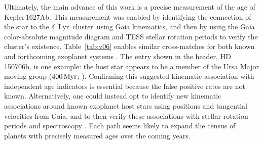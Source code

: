 \documentclass[12pt,modern,twocolumn,tighten]{aastex63}
\newcommand{\cn}{$\delta$\ Lyr\ cluster} %
\newcommand{\pn}{Kepler\,1627Ab} %
\begin{document}
Ultimately, the main advance of this work is a precise measurement of
the age of \pn.   This measurement was enabled by identifying the
connection of the star to the \cn\ using Gaia kinematics, and then by
using the Gaia color-absolute magnitude diagram and TESS stellar rotation periods to verify
the cluster's existence.  Table~\ref{tab:v06} enables similar
cross-matches for both known and forthcoming exoplanet
systems \citep[{\it e.g.},][]{guerrero_tess_2021}.  The entry shown in
the header, HD 150706b, is one example: the
host star appears to be a member of the Ursa Major moving group
($400\,{\rm Myr}$; \citealt{mann_tess_2020}).  Confirming
this suggested kinematic association with independent age indicators is
essential because the false positive rates are not known.
Alternatively, one could instead opt to identify new kinematic
associations around known exoplanet host stars using positions and
tangential velocities from Gaia, and to then verify these associations
with stellar rotation periods and spectroscopy \citep[{\it
e.g.},][]{tofflemire_tess_2021}.  
Each path seems likely to expand the census of planets with precisely
measured ages over the coming years.




\clearpage
\acknowledgements
\raggedbottom
\end{document}
